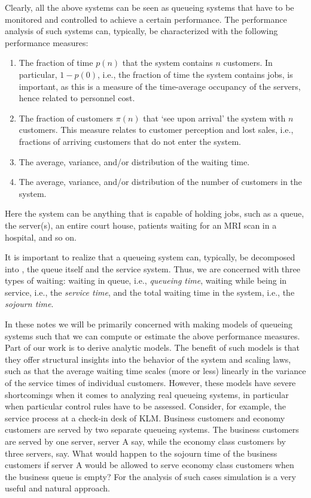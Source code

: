 Clearly, all the above systems can be seen as queueing systems that
have to be monitored and controlled to achieve a certain
performance. The performance analysis of such systems can, typically,
be characterized with the following performance measures:
\begin{enumerate}
\item The fraction of time $p(n)$ that the system contains $n$
  customers. In particular, $1-p(0)$, i.e., the fraction of time the
  system contains jobs, is important, as this is a measure of the
  time-average occupancy of the servers, hence related to personnel
  cost.
\item The fraction of customers $\pi(n)$ that `see upon arrival' the
  system with $n$ customers. This measure relates to customer
  perception and lost sales, i.e., fractions of arriving customers
  that do not enter the system.
\item The average, variance, and/or distribution of the waiting time.
\item The average, variance, and/or distribution of the number of customers in the system.\
\end{enumerate}
Here the system can be anything that is capable of holding jobs, such
as a queue, the server(s), an entire court house, patients waiting for
an MRI scan in a hospital, and so on.

It is important to realize that a queueing system can, typically, be
decomposed into \recall{two subsystems}, the queue itself and the
service system. Thus, we are concerned with three types of waiting:
waiting in queue, i.e., \emph{queueing time}, waiting while being in
service, i.e., the \emph{service time}, and the total waiting time in
the system, i.e., the \emph{sojourn time}.

In these notes we will be primarily concerned with making models of
queueing systems such that we can compute or estimate the above
performance measures.  Part of our work is to derive analytic
models. The benefit of such models is that they offer structural
insights into the behavior of the system and scaling laws, such as
that the average waiting time scales (more or less) linearly in the
variance of the service times of individual customers. However, these
models have severe shortcomings when it comes to analyzing real
queueing systems, in particular when particular control rules have to
be assessed.  Consider, for example, the service process at a check-in
desk of KLM. Business customers and economy customers are served by
two separate queueing systems. The business customers are served by
one server, server A say, while the economy class customers by three
servers, say. What would happen to the sojourn time of the business
customers if server A would be allowed to serve economy class
customers when the business queue is empty? For the analysis of such
cases simulation is a very useful and natural approach.

